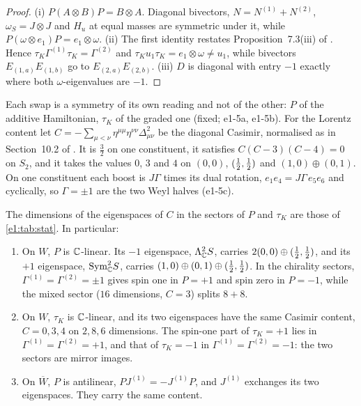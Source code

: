 \begin{proof}
(i) $P(A\otimes B)P=B\otimes A$. Diagonal bivectors, $N=N^{(1)}+N^{(2)}$, $\omega_S=J\otimes J$ and $H_u$ at equal masses are symmetric under it,
while $P(\omega\otimes e_1)P=e_1\otimes\omega$. (ii) The first identity restates Proposition~7.3(iii) of \cite{RE}. Hence
$\tau_K\Gamma^{(1)}\tau_K=\Gamma^{(2)}$ and $\tau_Ku_1\tau_K=e_1\otimes\omega\neq u_1$, while bivectors $E_{(1,a)}E_{(1,b)}$ go to $E_{(2,a)}E_{(2,b)}$. (iii) $D$ is
diagonal with entry $-1$ exactly where both $\omega$-eigenvalues are $-1$.
\end{proof}

Each swap is a symmetry of its own reading and not of the other: $P$ of the additive Hamiltonian, $\tau_K$ of the graded one (fixed; e1-5a,
e1-5b). For the Lorentz content let $C=-\sum_{\mu<\nu}\eta^{\mu\mu}\eta^{\nu\nu}\Delta_{\mu\nu}^2$ be the diagonal Casimir, normalised as in Section~10.2
of \cite{ES17}. It is $\tfrac32$ on one constituent, it satisfies $C(C-3)(C-4)=0$ on $S_2$, and it takes the values $0$, $3$ and $4$ on
$(0,0)$, $(\tfrac12,\tfrac12)$ and $(1,0)\oplus(0,1)$. On one constituent each boost is $J\Gamma$ times its dual rotation,
$e_1e_4=J\Gamma\,e_5e_6$ and cyclically, so $\Gamma=\pm1$ are the two Weyl halves (e1-5c).

\begin{proposition}
\label{e1:prop:stat}
The dimensions of the eigenspaces of $C$ in the sectors of $P$ and $\tau_K$ are those of \cref{e1:tab:stat}. In particular:
\begin{enumerate}[label=(\roman*),leftmargin=2.2em]
\item On $W$, $P$ is $\mathbb{C}$-linear. Its $-1$ eigenspace, $\Lambda^2_{\mathbb{C}} S$, carries $2(0,0)\oplus(\tfrac12,\tfrac12)$, and its $+1$ eigenspace, $\mathrm{Sym}^2_{\mathbb{C}} S$,
carries $(1,0)\oplus(0,1)\oplus(\tfrac12,\tfrac12)$. In the chirality sectors, $\Gamma^{(1)}=\Gamma^{(2)}=\pm1$ gives spin one in $P=+1$ and spin zero in
$P=-1$, while the mixed sector ($16$ dimensions, $C=3$) splits $8+8$.
\item On $W$, $\tau_K$ is $\mathbb{C}$-linear, and its two eigenspaces have the same Casimir content, $C=0,3,4$ on $2,8,6$ dimensions. The spin-one part of
$\tau_K=+1$ lies in $\Gamma^{(1)}=\Gamma^{(2)}=+1$, and that of $\tau_K=-1$ in $\Gamma^{(1)}=\Gamma^{(2)}=-1$: the two sectors are mirror images.
\item On $\overline W$, $P$ is antilinear, $PJ^{(1)}=-J^{(1)}P$, and $J^{(1)}$ exchanges its two eigenspaces. They carry the same content.
\end{enumerate}
\end{proposition}

